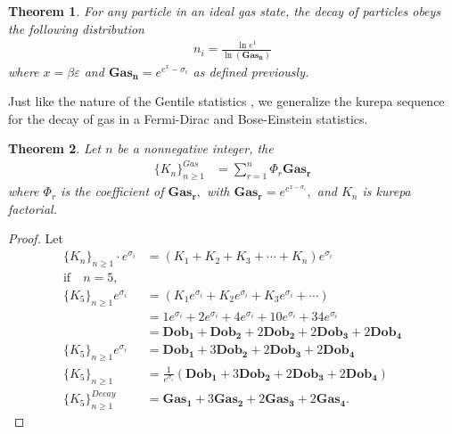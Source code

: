 \documentclass[pdflatex,sn-mathphys-num]{sn-jnl}%
\newtheorem{theorem}{Theorem}
\theoremstyle{thmstyleone}%
\theoremstyle{thmstyletwo}%
\theoremstyle{thmstylethree}%
\begin{document}
\begin{theorem}
    For any particle in an ideal gas state, the decay of particles obeys the following distribution
    \begin{align*}
    n_i = \frac{\ln e^1}{\ln (\mathbf{Gas_n})}
    \end{align*}
     where $x = \beta \varepsilon $ and $\mathbf{Gas_n} = e^{e^x-\sigma_i}$ as defined previously.
\end{theorem}
Just like the nature of the Gentile statistics \cite{gentile1940itosservazioni, dai2004gentile, katsura1970intermediate}, we generalize the kurepa sequence for the decay of gas in a Fermi-Dirac and Bose-Einstein statistics. 
\begin{theorem}\label{Gasn}
Let $n$ be a nonnegative integer, the
\begin{align*}
    \lbrace K_n \rbrace_{n\geq 1}^{Gas} & = \sum^n_{r=1} \Phi_r \mathbf{Gas_r}
    \end{align*}
where $\Phi_r$ is the coefficient of $\mathbf{Gas_r},$ with $\mathbf{Gas_r} = e^{e^{x-\sigma_i}},$ and  $K_n$ is  kurepa factorial.
\end{theorem}
\begin{proof}Let 
    \begin{align*}
\lbrace K_n \rbrace_{n\geq 1}\cdotp e^{\sigma_i}& = (K_1 + K_2 + K_3 + \cdots+ K_n )e^{\sigma_i}\\
\text{if} \quad n=5,\\
\lbrace K_5 \rbrace_{n\geq 1} e^{\sigma_i}& = (K_1e^{\sigma_i} + K_2e^{\sigma_i} + K_3e^{\sigma_i} + \cdots )\\
& = 1e^{\sigma_i} + 2 e^{\sigma_i}+ 4e^{\sigma_i} + 10e^{\sigma_i} + 34e^{\sigma_i}\\
& =\mathbf{Dob_1}  +  \mathbf{Dob_2} + 2 \mathbf{Dob_2} + 2 \mathbf{Dob_3} + 2 \mathbf{Dob_4}\\
\lbrace K_5 \rbrace_{n\geq 1} e^{\sigma_i}& = \mathbf{Dob_1} + 3 \mathbf{Dob_2} + 2 \mathbf{Dob_3} + 2 \mathbf{Dob_4}\\
\lbrace K_5 \rbrace_{n\geq 1} & = \frac{1}{e^{\sigma_i}}( \mathbf{Dob_1} + 3 \mathbf{Dob_2} + 2 \mathbf{Dob_3} + 2 \mathbf{Dob_4})\\
\lbrace K_5 \rbrace_{n\geq 1}^{Decay} & = \mathbf{Gas_1} + 3 \mathbf{Gas_2} + 2 \mathbf{Gas_3} + 2 \mathbf{Gas_4}.
\end{align*}
\end{proof}
\end{document}
